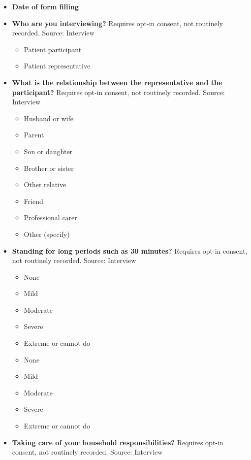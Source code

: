 \documentclass[
]{scrartcl}
\providecommand{\tightlist}{%
  \setlength{\itemsep}{0pt}\setlength{\parskip}{0pt}}\usepackage{longtable,booktabs,array}
\begin{document}
\begin{itemize}
\item
  \textbf{Date of form filling}
\item
  \textbf{Who are you interviewing?} Requires opt-in consent, not
  routinely recorded. Source: Interview

  \begin{itemize}
  \tightlist
  \item
    Patient participant
  \item
    Patient representative
  \end{itemize}
\item
  \textbf{What is the relationship between the representative and the
  participant?} Requires opt-in consent, not routinely recorded. Source:
  Interview

  \begin{itemize}
  \tightlist
  \item
    Husband or wife
  \item
    Parent
  \item
    Son or daughter
  \item
    Brother or sister
  \item
    Other relative
  \item
    Friend
  \item
    Professional carer
  \item
    Other (specify)
  \end{itemize}
\item
  \textbf{Standing for long periods such as 30 minutes?} Requires opt-in
  consent, not routinely recorded. Source: Interview

  \begin{itemize}
  \tightlist
  \item
    None
  \item
    Mild
  \item
    Moderate
  \item
    Severe
  \item
    Extreme or cannot do
  \item
    None
  \item
    Mild
  \item
    Moderate
  \item
    Severe
  \item
    Extreme or cannot do
  \end{itemize}
\item
  \textbf{Taking care of your household responsibilities?} Requires
  opt-in consent, not routinely recorded. Source: Interview


\end{itemize}
\end{document}
